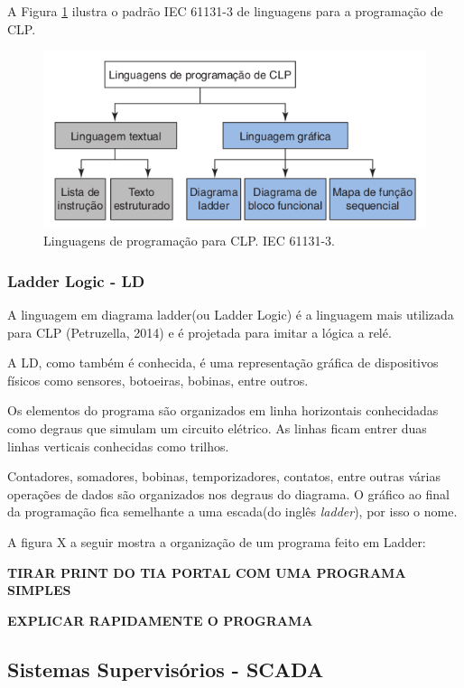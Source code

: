 \documentclass[a4paper, 12pt]{article}
\begin{document}
		A Figura \ref{fig:progam-language-clp} ilustra o padrão IEC 61131-3 de linguagens para a programação de CLP.

		\begin{figure}[H]
			\centering
			\includegraphics[scale=0.5]{figures/programming_language_for_CLP_IEC-61131-3.png}
			\caption{Linguagens de programação para CLP. IEC 61131-3.}
			\label{fig:progam-language-clp}
		\end{figure}
		
		\subsubsection{Ladder Logic - LD}
		
			A linguagem em diagrama ladder(ou Ladder Logic) é a linguagem mais utilizada para CLP (Petruzella, 2014)
			e é projetada para imitar a lógica a relé.
		
			A LD, como também é conhecida, é uma representação gráfica de dispositivos físicos
			como sensores, botoeiras, bobinas, entre outros.
			
			Os elementos do programa são organizados em linha horizontais conhecidadas como
			degraus que simulam um circuito elétrico. As linhas ficam entrer duas linhas
			verticais conhecidas como trilhos.
			
			Contadores, somadores, bobinas, temporizadores, contatos, entre outras várias
			operações de dados são organizados nos degraus do diagrama.
			O gráfico ao final da programação fica semelhante a uma escada(do inglês \textit{ladder}), por isso o nome.
			
			A figura X a seguir mostra a organização de um programa feito em Ladder:
			
			\textbf{TIRAR PRINT DO TIA PORTAL COM UMA PROGRAMA SIMPLES}
			
			\textbf{EXPLICAR RAPIDAMENTE O PROGRAMA}

	\subsection{Sistemas Supervisórios - SCADA}
		
\end{document}
